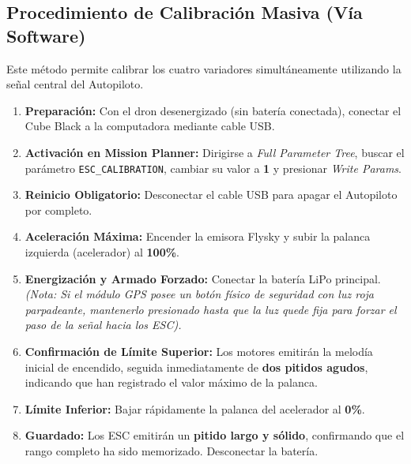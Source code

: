 \documentclass[12pt,a4paper]{article}
\begin{document}
\subsection{Procedimiento de Calibración Masiva (Vía Software)}
Este método permite calibrar los cuatro variadores simultáneamente utilizando la señal central del Autopiloto.
\begin{enumerate}[leftmargin=*]
    \item \textbf{Preparación:} Con el dron desenergizado (sin batería conectada), conectar el Cube Black a la computadora mediante cable USB.
    \item \textbf{Activación en Mission Planner:} Dirigirse a \textit{Full Parameter Tree}, buscar el parámetro \texttt{ESC\_CALIBRATION}, cambiar su valor a \textbf{1} y presionar \textit{Write Params}.
    \item \textbf{Reinicio Obligatorio:} Desconectar el cable USB para apagar el Autopiloto por completo.
    \item \textbf{Aceleración Máxima:} Encender la emisora Flysky y subir la palanca izquierda (acelerador) al \textbf{100\%}.
    \item \textbf{Energización y Armado Forzado:} Conectar la batería LiPo principal. \textit{(Nota: Si el módulo GPS posee un botón físico de seguridad con luz roja parpadeante, mantenerlo presionado hasta que la luz quede fija para forzar el paso de la señal hacia los ESC).}
    \item \textbf{Confirmación de Límite Superior:} Los motores emitirán la melodía inicial de encendido, seguida inmediatamente de \textbf{dos pitidos agudos}, indicando que han registrado el valor máximo de la palanca.
    \item \textbf{Límite Inferior:} Bajar rápidamente la palanca del acelerador al \textbf{0\%}.
    \item \textbf{Guardado:} Los ESC emitirán un \textbf{pitido largo y sólido}, confirmando que el rango completo ha sido memorizado. Desconectar la batería.
\end{enumerate}
\end{document}
